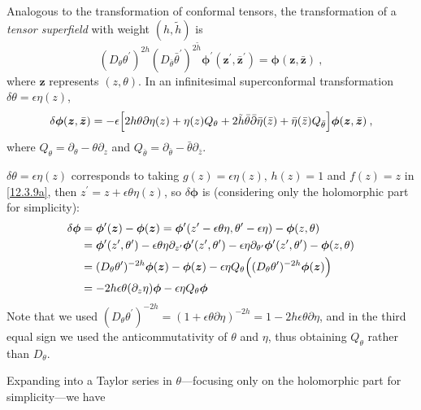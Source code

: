 Analogous to the transformation of conformal tensors, the transformation of a \textit{tensor superfield} with weight $(h,\tilde{h})$ is
\begin{equation}
	(D_{\theta}\theta^{\prime})^{2h}(D_{\bar{\theta}}\bar{\theta}^{\prime})^{2\tilde{h}}
	\bm{\phi}^{\prime}(\bm{z}^{\prime},\bar{\bm{z}}^{\prime}) = \bm{\phi}(\bm{z},\bar{\bm{z}}) \:, \label{12.3.11}
\end{equation}
where $\bm{z}$ represents $(z,\theta)$. In an infinitesimal superconformal transformation $\delta \theta=\epsilon\eta(z)$,
\begin{equation}
	\delta\bm{\phi}(\bm{z},\bar{\bm{z}})=-\epsilon
	\Bigl[2h\theta\partial\eta(z)+\eta(z)Q_{\theta}+2\tilde{h}\bar{\theta}\bar{\partial}\bar{\eta}(\bar{z})
	+\bar{\eta}(\bar{z})Q_{\bar{\theta}}\Bigr]\bm{\phi}(\bm{z},\bar{\bm{z}}) \:, \label{12.3.12}
\end{equation}
where $Q_{\theta}=\partial_{\theta}-\theta\partial_{z}$ and $Q_{\bar{\theta}}=\partial_{\bar{\theta}}-\bar{\theta}\partial_{\bar{z}}$.
\begin{tcolorbox}[breakable]
	$\delta\theta = \epsilon\eta(z)$ corresponds to taking $g(z)=\epsilon\eta(z),\,h(z)=1$ and $f(z)=z$ in \eqref{12.3.9a}, then $z^{\prime}=z+\epsilon\theta\eta(z)$, so $\delta \bm{\phi}$ is (considering only the holomorphic part for simplicity):
	\begin{align*}
		\delta\bm{\phi}&= \bm{\phi}^{\prime}(\bm{z})-\bm{\phi}(\bm{z}) = \bm{\phi}^{\prime}(z^{\prime}-\epsilon\theta\eta,\theta^{\prime}-\epsilon\eta)-\bm{\phi}(z,\theta) \\
		&=\bm{\phi}^{\prime}(z^{\prime},\theta^{\prime})
		-\epsilon\theta\eta\partial_{z^{\prime}}\bm{\phi}^{\prime}(z^{\prime},\theta^{\prime})
		-\epsilon\eta\partial_{\theta^{\prime}}\bm{\phi}^{\prime}(z^{\prime},\theta^{\prime}) -\bm{\phi}(z,\theta)\\
		&=(D_{\theta}\theta^{\prime})^{-2h}\bm{\phi}(\bm{z})-\bm{\phi}(\bm{z})
		-\epsilon\eta Q_{\theta}\Bigl((D_{\theta}\theta^{\prime})^{-2h}\bm{\phi}(\bm{z})\Bigr) \\
		&= -2h\epsilon\theta(\partial_{z}\eta) \bm{\phi} -\epsilon\eta Q_{\theta}\bm{\phi}
	\end{align*}
	Note that we used $(D_{\theta}\theta^{\prime})^{-2h}=(1+\epsilon\theta\partial\eta)^{-2h}=1-2h\epsilon\theta\partial\eta$, and in the third equal sign we used the anticommutativity of $\theta$ and $\eta$, thus obtaining $Q_{\theta}$ rather than $D_{\theta}$.
\end{tcolorbox}
Expanding into a Taylor series in $\theta$—focusing only on the holomorphic part for simplicity—we have
